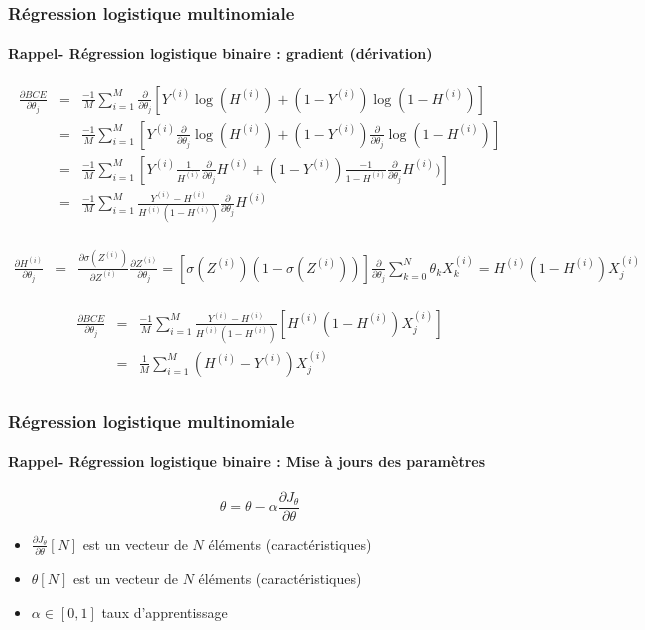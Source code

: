 \documentclass[xcolor=table]{beamer}
\begin{document}
\begin{frame}
	\frametitle{Régression logistique multinomiale}
	\framesubtitle{Rappel- Régression logistique binaire : gradient (dérivation)}
	
	\scriptsize
	\vspace{-12pt}
	\begin{align*}
	\frac{\partial BCE}{\partial \theta_j} 
	& = & \frac{-1}{M} \sum\limits_{i=1}^{M} \frac{\partial}{\partial \theta_j} [Y^{(i)} \log(H^{(i)}) + (1- Y^{(i)}) \log(1 - H^{(i)})] \\
	& = & \frac{-1}{M} \sum\limits_{i=1}^{M} [ Y^{(i)} \frac{\partial}{\partial \theta_j} \log(H^{(i)}) + (1- Y^{(i)}) \frac{\partial}{\partial \theta_j}\log(1 - H^{(i)})]\\
	& = & \frac{-1}{M} \sum\limits_{i=1}^{M} [ Y^{(i)} \frac{1}{H^{(i)}} \frac{\partial}{\partial \theta_j} H^{(i)} + (1- Y^{(i)}) \frac{-1}{1-H^{(i)}} \frac{\partial}{\partial \theta_j} H^{(i)})] \\
	& = & \frac{-1}{M} \sum\limits_{i=1}^{M} \frac{Y^{(i)}-H^{(i)}}{H^{(i)}(1-H^{(i)})} \frac{\partial}{\partial \theta_j} H^{(i)} \\
	\end{align*}
	
	\vspace{-24pt}
	\begin{align*}
	\frac{\partial H^{(i)}}{\partial \theta_j} 
	& = & \frac{\partial \sigma(Z^{(i)})}{\partial Z^{(i)}} \frac{\partial Z^{(i)}}{\partial \theta_j}
	 =  [\sigma(Z^{(i)}) (1-\sigma(Z^{(i)}))]\frac{\partial}{\partial \theta_j} \sum\limits_{k=0}^{N} \theta_k X_k^{(i)} 
	 =  H^{(i)} (1-H^{(i)})  X_j^{(i)}\\
	\end{align*}
	
	\vspace{-24pt}
	\begin{align*}
	\frac{\partial BCE}{\partial \theta_j} 
	& = & \frac{-1}{M} \sum\limits_{i=1}^{M} \frac{Y^{(i)}-H^{(i)}}{H^{(i)}(1-H^{(i)})} [H^{(i)} (1-H^{(i)}) X_j^{(i)}] \\
	& = & \frac{1}{M} \sum\limits_{i=1}^{M} (H^{(i)} - Y^{(i)}) X_j^{(i)}\\
	\end{align*}
		
\end{frame}

\begin{frame}
	\frametitle{Régression logistique multinomiale}
	\framesubtitle{Rappel- Régression logistique binaire : Mise à jours des paramètres}
	
	\[\theta = \theta - \alpha \frac{\partial J_\theta}{\partial \theta}\]
	
	\begin{itemize}
		\item $\frac{\partial J_\theta}{\partial \theta}[N]$ est un vecteur de $N$ éléments (caractéristiques)
		\item $\theta[N]$ est un vecteur de $N$ éléments (caractéristiques)
		\item $\alpha \in [0, 1]$ taux d'apprentissage
	\end{itemize}
	
\end{frame}
\end{document}
